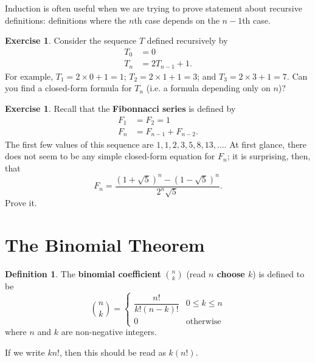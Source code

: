 \documentclass[a4paper]{amsart}
\theoremstyle{definition}
\newtheorem{defn}[thm]{Definition}
\newtheorem{exercise}[thm]{Exercise}
\theoremstyle{remark}
\begin{document}
Induction is often useful when we are trying to prove statement about recursive definitions: definitions where
the $n$th case depends on the $ n - 1$th case.

\begin{exercise}
  Consider the sequence $ T $ defined recursively by
  \begin{align*}
    T_0 &= 0\\
    T_n &= 2T_{n - 1} + 1.
  \end{align*}
  For example, $ T_1 = 2 \times 0 + 1 = 1 $; $ T_2 = 2 \times 1 + 1 = 3 $; and $ T_3 = 2 \times 3 + 1 = 7 $. Can you find
  a closed-form formula for $ T_n $ (i.e. a formula depending only on $ n $)?
\end{exercise}

\begin{exercise}
  Recall that the \textbf{Fibonnacci series} is defined by
  \begin{align*}
    F_1 &= F_2 = 1\\
    F_n &= F_{n - 1} + F_{n - 2}.
  \end{align*}
  The first few values of this sequence are $ 1, 1, 2, 3, 5, 8, 13, \dots $. At first glance, there does not seem to be
  any simple closed-form equation for $ F_n $; it is surprising, then, that
  \begin{displaymath}
    F_n = \frac{\left(1 + \sqrt{5}\right)^n - \left(1 - \sqrt{5}\right)^n}{2^n \sqrt{5}}.
  \end{displaymath}
  Prove it.
\end{exercise}

\section{The Binomial Theorem}
\begin{defn}
  The \textbf{binomial coefficient} $ \binom{n}{k} $ (read \textbf{$ n $ choose $ k $}) is defined to be
  \begin{displaymath}
    \binom{n}{k} = \begin{cases}
                     \dfrac{n!}{k!(n - k)!} & 0 \leq k \leq n\\
                     0 & \text{otherwise}
                   \end{cases}
  \end{displaymath}
  where $ n $ and $ k $ are non-negative integers.
\end{defn}

If we write $ kn! $, then this should be read as $ k(n!) $.
\end{document}
